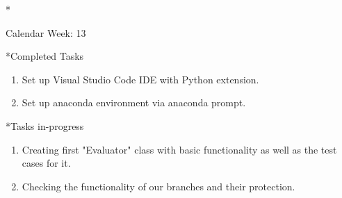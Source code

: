 \documentclass[11pt,a4paper]{article}
\begin{document}
\newpage
\begin{section}*{Calendar Week: 13 \hfill \date{02 April, 2021}}
	
	\begin{subsection}*{Completed Tasks}
		\begin{enumerate}
			\item Set up Visual Studio Code IDE with Python extension.
			\item Set up anaconda environment via anaconda prompt.
		\end{enumerate}
	\end{subsection}
	
	\begin{subsection}*{Tasks in-progress}
		\begin{enumerate}
			\item Creating first "Evaluator" class with basic functionality as well as the test cases for it.
			\item Checking the functionality of our branches and their protection.
		\end{enumerate}
	\end{subsection}
	
\end{section}
\end{document}
